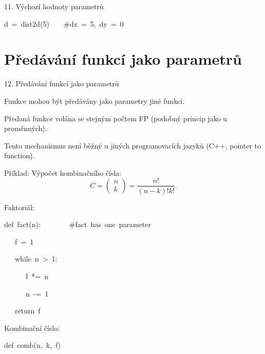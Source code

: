 \documentclass[czech]{beamer}
\newenvironment{lyxcode}
  {\par\begin{list}{}{
    \setlength{\rightmargin}{\leftmargin}
    \setlength{\listparindent}{0pt}%
    \raggedright
    \setlength{\itemsep}{0pt}
    \setlength{\parsep}{0pt}
    \normalfont\ttfamily}%
   \def\{{\char`\{}
   \def\}{\char`\}}
   \def\textasciitilde{\char`\~}
   \item[]}
  {\end{list}}
\begin{document}
\begin{frame}{11. Výchozí hodnoty parametrů}
\begin{enumerate}
\begin{lyxcode}
{\scriptsize d~=~dist2d(5)~~~~\#dx~=~5,~dy~=~0}{\scriptsize\par}
\end{lyxcode}
\end{enumerate}
\end{frame}


\section{Předávání funkcí jako parametrů}
\begin{frame}{12. Předávání funkcí jako parametrů}

{\scriptsize Funkce mohou být předávány jako parametry jiné funkci.}{\scriptsize\par}

{\scriptsize Předaná funkce volána se stejným počtem FP (podobný princip
jako u proměnných).}{\scriptsize\par}

{\scriptsize Tento mechanismus není běžný u jiných programovacích jazyků
(C++, pointer to function).\bigskip{}
}{\scriptsize\par}

{\scriptsize Příklad: Výpočet kombinačního čísla:
\[
C=\left(\begin{array}{c}
n\\
k
\end{array}\right)=\frac{n!}{(n-k)!k!}.
\]
}{\scriptsize\par}

{\scriptsize Faktoriál:}{\scriptsize\par}
\begin{lyxcode}
{\scriptsize def~fact(n):~~~~~~~~\#fact~has~one~parameter}{\scriptsize\par}

{\scriptsize ~~~f~=~1}{\scriptsize\par}

{\scriptsize ~~~while~n~>~1:}{\scriptsize\par}

{\scriptsize ~~~~~~f~{*}=~n~~~~~}{\scriptsize\par}

{\scriptsize ~~~~~~n~-=~1}{\scriptsize\par}

{\scriptsize ~~~return~f~~~}{\scriptsize\par}
\end{lyxcode}
{\scriptsize Kombinační číslo:}{\scriptsize\par}
\begin{lyxcode}
{\scriptsize def~comb(n,~k,~f)}{\scriptsize\par}


\end{lyxcode}
\end{frame}
\end{document}

